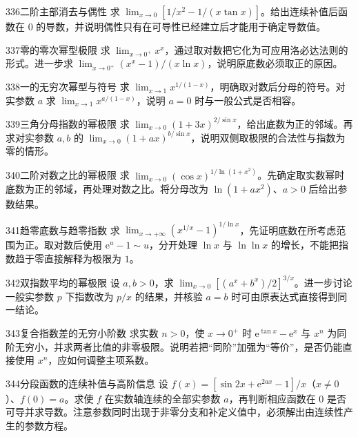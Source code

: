 \begin{exercise}{336}{二阶主部消去与偶性}
求 $\lim_{x\to0}[1/x^2-1/(x\tan x)]$。给出连续补值后函数在 $0$ 的导数，并说明偶性只有在可导性已经建立后才能用于确定导数值。
\end{exercise}
\begin{exercise}{337}{零的零次幂型极限}
求 $\lim_{x\to0^+}x^x$，通过取对数把它化为可应用洛必达法则的形式。进一步求 $\lim_{x\to0^+}(x^x-1)/(x\ln x)$，说明原底数必须取正的原因。
\end{exercise}
\begin{exercise}{338}{一的无穷次幂型与符号}
求 $\lim_{x\to1}x^{1/(1-x)}$，明确取对数后分母的符号。对实参数 $a$ 求 $\lim_{x\to1}x^{a/(1-x)}$，说明 $a=0$ 时与一般公式是否相容。
\end{exercise}
\begin{exercise}{339}{三角分母指数的幂极限}
求 $\lim_{x\to0}(1+3x)^{2/\sin x}$，给出底数为正的邻域。再求对实参数 $a,b$ 的 $\lim_{x\to0}(1+ax)^{b/\sin x}$，说明双侧取极限的合法性与指数为零的情形。
\end{exercise}
\begin{exercise}{340}{二阶对数之比的幂极限}
求 $\lim_{x\to0}(\cos x)^{1/\ln(1+x^2)}$。先确定取实数幂时底数为正的邻域，再处理对数之比。将分母改为 $\ln(1+ax^2)$、$a>0$ 后给出参数结果。
\end{exercise}
\begin{exercise}{341}{趋零底数与趋零指数}
求 $\lim_{x\to+\infty}(x^{1/x}-1)^{1/\ln x}$，先证明底数在所考虑范围为正。取对数后使用 $\mathrm e^u-1\sim u$，分开处理 $\ln x$ 与 $\ln\ln x$ 的增长，不能把指数趋于零直接解释为极限为 $1$。
\end{exercise}
\begin{exercise}{342}{双指数平均的幂极限}
设 $a,b>0$，求 $\lim_{x\to0}[(a^x+b^x)/2]^{3/x}$。进一步讨论一般实参数 $p$ 下指数改为 $p/x$ 的结果，并核验 $a=b$ 时可由原表达式直接得到同一结论。
\end{exercise}
\begin{exercise}{343}{复合指数差的无穷小阶数}
求实数 $n>0$，使 $x\to0^+$ 时 $\mathrm e^{\tan x}-\mathrm e^x$ 与 $x^n$ 为同阶无穷小，并求两者比值的非零极限。说明若把“同阶”加强为“等价”，是否仍能直接使用 $x^n$，应如何调整主项系数。
\end{exercise}
\begin{exercise}{344}{分段函数的连续补值与高阶信息}
设 $f(x)=[\sin2x+\mathrm e^{2ax}-1]/x$（$x\ne0$）、$f(0)=a$。求使 $f$ 在实数轴连续的全部实参数 $a$，再判断相应函数在 $0$ 是否可导并求导数。注意参数同时出现于非零分支和补定义值中，必须解出由连续性产生的参数方程。
\end{exercise}
